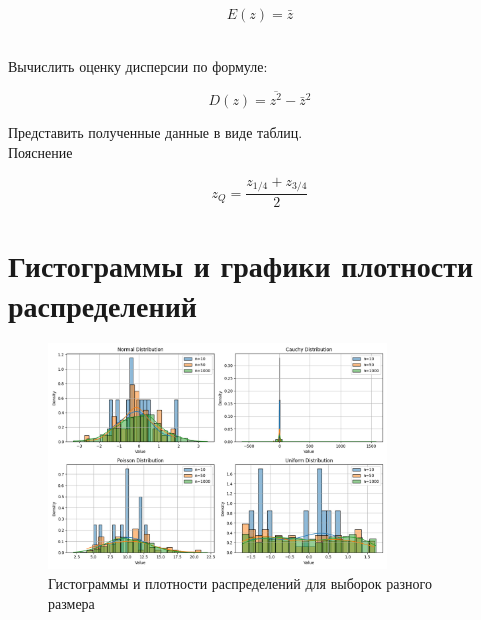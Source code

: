 \documentclass[a4paper]{article}
\begin{document}
    $$
    E(z)=\bar{z}
    $$


    \\  Вычислить оценку дисперсии по формуле:

    $$
    D(z)=\overline{z^2}-\bar{z}^2
    $$


    Представить полученные данные в виде таблиц.
    \\ Пояснение

    $$
    z_Q=\frac{z_{1 / 4}+z_{3 / 4}}{2}
    $$


    \section{Гистограммы и графики плотности распределений}\label{sec:----}
    \begin{figure}[H]
        \centering
        \includegraphics[width=0.8\textwidth]{../histograms} %
        \caption{Гистограммы и плотности распределений для выборок разного размера}\label{fig:figure}
    \end{figure}
\end{document}
